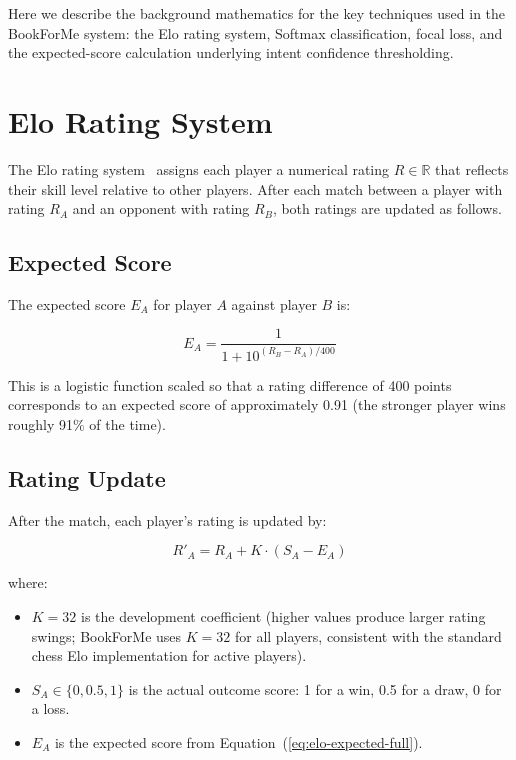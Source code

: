 Here we describe the background mathematics for the key techniques used in
the BookForMe system: the Elo rating system, Softmax classification, focal loss,
and the expected-score calculation underlying intent confidence thresholding.

\section{Elo Rating System}
\label{app:math-elo}

The Elo rating system~\cite{elo1978} assigns each player a numerical rating
$R \in \mathbb{R}$ that reflects their skill level relative to other players.
After each match between a player with rating $R_A$ and an opponent with rating
$R_B$, both ratings are updated as follows.

\subsection{Expected Score}

The expected score $E_A$ for player $A$ against player $B$ is:

\begin{equation}
  E_A = \frac{1}{1 + 10^{(R_B - R_A)/400}}
  \label{eq:elo-expected-full}
\end{equation}

This is a logistic function scaled so that a rating difference of 400 points
corresponds to an expected score of approximately 0.91 (the stronger player wins
roughly 91\% of the time).

\subsection{Rating Update}

After the match, each player's rating is updated by:

\begin{equation}
  R'_A = R_A + K \cdot (S_A - E_A)
  \label{eq:elo-update-full}
\end{equation}

\noindent where:
\begin{itemize}
  \item $K = 32$ is the development coefficient (higher values produce larger
        rating swings; BookForMe uses $K = 32$ for all players, consistent with the
        standard chess Elo implementation for active players).
  \item $S_A \in \{0, 0.5, 1\}$ is the actual outcome score: 1 for a win, 0.5 for
        a draw, 0 for a loss.
  \item $E_A$ is the expected score from Equation~(\ref{eq:elo-expected-full}).
\end{itemize}

